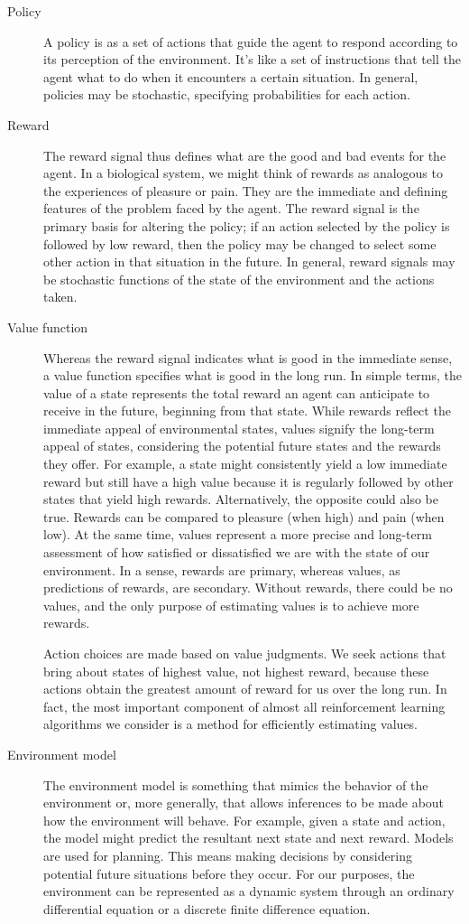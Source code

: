 \documentclass[
  letterpaper,
]{krantz}
\theoremstyle{plain}
\theoremstyle{definition}
\theoremstyle{definition}
\theoremstyle{remark}
\begin{document}
\begin{description}
\item[Policy]
A policy is as a set of actions that guide the agent to respond
according to its perception of the environment. It's like a set of
instructions that tell the agent what to do when it encounters a certain
situation. In general, policies may be stochastic, specifying
probabilities for each action.
\item[Reward]
The reward signal thus defines what are the good and bad events for the
agent. In a biological system, we might think of rewards as analogous to
the experiences of pleasure or pain. They are the immediate and defining
features of the problem faced by the agent. The reward signal is the
primary basis for altering the policy; if an action selected by the
policy is followed by low reward, then the policy may be changed to
select some other action in that situation in the future. In general,
reward signals may be stochastic functions of the state of the
environment and the actions taken.
\item[Value function]
Whereas the reward signal indicates what is good in the immediate sense,
a value function specifies what is good in the long run. In simple
terms, the value of a state represents the total reward an agent can
anticipate to receive in the future, beginning from that state. While
rewards reflect the immediate appeal of environmental states, values
signify the long-term appeal of states, considering the potential future
states and the rewards they offer. For example, a state might
consistently yield a low immediate reward but still have a high value
because it is regularly followed by other states that yield high
rewards. Alternatively, the opposite could also be true. Rewards can be
compared to pleasure (when high) and pain (when low). At the same time,
values represent a more precise and long-term assessment of how
satisfied or dissatisfied we are with the state of our environment. In a
sense, rewards are primary, whereas values, as predictions of rewards,
are secondary. Without rewards, there could be no values, and the only
purpose of estimating values is to achieve more rewards.

Action choices are made based on value judgments. We seek actions that
bring about states of highest value, not highest reward, because these
actions obtain the greatest amount of reward for us over the long run.
In fact, the most important component of almost all reinforcement
learning algorithms we consider is a method for efficiently estimating
values.
\item[Environment model]
The environment model is something that mimics the behavior of the
environment or, more generally, that allows inferences to be made about
how the environment will behave. For example, given a state and action,
the model might predict the resultant next state and next reward. Models
are used for planning. This means making decisions by considering
potential future situations before they occur. For our purposes, the
environment can be represented as a dynamic system through an ordinary
differential equation or a discrete finite difference equation.
\end{description}
\end{document}
